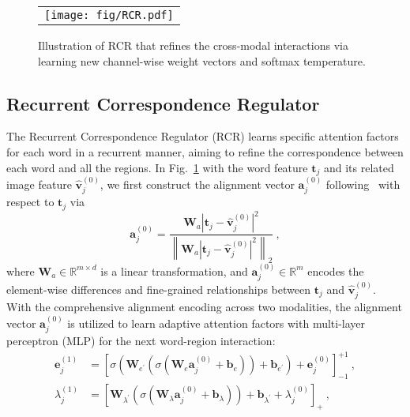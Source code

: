 \documentclass[journal]{IEEEtran}\newcommand{\ignore}[1]{}
\begin{document}
\begin{figure}[t!]
	\centering
	\begin{tabular}{@{}c}
		\texttt{[image: fig/RCR.pdf]}
	\end{tabular}
	\caption{Illustration of RCR that refines the cross-modal interactions via learning new channel-wise weight vectors and softmax temperature.}
	\label{fig:RCR}
\end{figure}

\subsection{Recurrent Correspondence Regulator} 
The Recurrent Correspondence Regulator (RCR) learns specific attention factors for each word in a recurrent manner, aiming to refine the correspondence between each word and all the regions. In Fig.~\ref{fig:RCR} with the word feature $\boldsymbol{t}_{j}$ and its related image feature $\hat{\boldsymbol{v}}_{j}^{(0)}$, we first construct the alignment vector $\boldsymbol{a}_{j}^{(0)}$ following~\cite{GRN19} with respect to $\boldsymbol{t}_{j}$ via
\begin{equation}
\label{eq:aj}
\boldsymbol{a}_{j}^{(0)} = \frac{\boldsymbol{W}_{a}{\left | \boldsymbol{t}_{j}- \hat{\boldsymbol{v}}_{j}^{(0)} \right |}^{2}}{{\left \| \boldsymbol{W}_{a}{\left | \boldsymbol{t}_{j}- \hat{\boldsymbol{v}}_{j}^{(0)} \right |}^{2} \right \|}_{2}} \ ,
\end{equation}
where $\boldsymbol{W}_{a}\in \mathbb{R}^{m\times d}$ is a linear transformation, and $\boldsymbol{a}_{j}^{(0)} \in \mathbb{R}^{m}$ encodes the element-wise differences and fine-grained relationships between $\boldsymbol{t}_{j}$ and $\hat{\boldsymbol{v}}_{j}^{(0)}$. With the comprehensive alignment encoding across two modalities, the alignment vector $\boldsymbol{a}_{j}^{(0)}$ is utilized to learn adaptive attention factors with multi-layer perceptron (MLP) for the next word-region interaction:
\begin{equation}
\label{eq:factors}
\begin{split}
    \boldsymbol{e}_{j}^{(1)} &= \left [ \sigma(\boldsymbol{W}_{e^{'}}(\sigma(\boldsymbol{W}_{e}\boldsymbol{a}_{j}^{(0)}+\boldsymbol{b}_{e}))+\boldsymbol{b}_{e^{'}}) + \boldsymbol{e}_{j}^{(0)} \right]_{-1}^{+1} \ , \\
    \lambda_{j}^{(1)} &= \left [ \boldsymbol{W}_{\lambda^{'}}(\sigma(\boldsymbol{W}_{\lambda}\boldsymbol{a}_{j}^{(0)}+\boldsymbol{b}_{\lambda}))+\boldsymbol{b}_{\lambda^{'}}+\lambda_{j}^{(0)} \right]_{+} \ ,
\end{split}
\end{equation}
\end{document}
